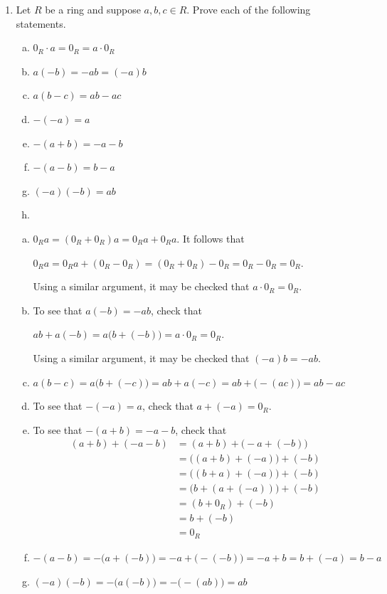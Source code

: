 \documentclass[11pt,fleqn,dvipsnames,usenames]{article}
\begin{document}
\begin{enumerate}[1.]
\item Let $R$ be a ring and suppose $a,b,c\in R$.  Prove each of the following statements.
\begin{multicols}{2}
\begin{enumerate}[(a)]
\item $0_{R}\cdot a = 0_{R} = a\cdot 0_{R}$
\item $a(-b) = -ab = (-a)b$
\item $a(b-c) = ab - ac$
\item $-(-a) = a$
\item $-(a+b) = -a - b$
\item $-(a-b) = b - a$
\item $(-a)(-b) = ab$
\item[\ ] 
\end{enumerate}
\end{multicols}
\vsmsp

\solution
\begin{enumerate}[(a)]
\item $0_{R}a = (0_{R} + 0_{R})a = 0_{R}a + 0_{R}a$.  It follows that
\begin{center}
$0_{R}a = 0_{R}a + (0_{R} - 0_{R}) = (0_{R} + 0_{R}) - 0_{R} = 0_{R} - 0_{R} = 0_{R}$.
\end{center}
Using a similar argument, it may be checked that $a\cdot 0_{R} = 0_{R}$.
\item To see that $a(-b) = -ab$, check that
\begin{center}
$ab + a(-b) = a\big(b + (-b)\big) = a\cdot 0_{R} = 0_{R}$.
\end{center}
Using a similar argument, it may be checked that $(-a)b = -ab$.
\item $a(b-c) = a\big(b + (-c)\big) = ab + a(-c) = ab + \big(-(ac)\big) = ab - ac$
\item To see that $-(-a) = a$, check that $a + (-a) = 0_{R}$.
\item To see that $-(a+b) = -a - b$, check that
\begin{align*}
(a+b) + (-a - b) &= (a+b) + \big(-a + (-b)\big)\\
&= \big((a + b) + (-a)\big) + (-b)\\
&= \big((b + a) + (-a)\big) + (-b)\\
&= \big(b + (a + (-a))\big) + (-b)\\
&= (b + 0_{R}) + (-b)\\
&= b + (-b)\\
&= 0_{R}
\end{align*}
\item $-(a-b) = -\big(a + (-b)\big) = -a + \big(-(-b)\big) = -a + b = b + (-a) = b-a$
\item $(-a)(-b) = -\big(a(-b)\big) = -\big(-(ab)\big) = ab$
\end{enumerate}


\end{enumerate}
\end{document}
